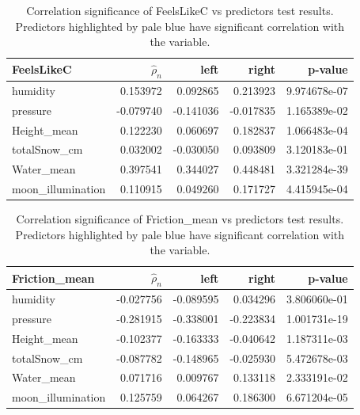 \documentclass[12pt, bachelor, substylefile = algo_title.rtx]{disser}
\theoremstyle{definition}
\begin{document}
\begin{table}[!h]
\centering
\begin{tabular}{|l|r|r|r|r|}
\hline
FeelsLikeC &   $\widehat{\rho}_n$  &      left &     right &        p-value \\
\hline
humidity          & 0.153972 &  0.092865 &  0.213923 &  9.974678e-07 \\
\hline
\cellcolor{blue!25} pressure          & -0.079740 & -0.141036 & -0.017835 &  1.165389e-02 \\
\hline
\cellcolor{blue!25} Height\_mean       & 0.122230 &  0.060697 &  0.182837 &  1.066483e-04 \\
\hline
 totalSnow\_cm      & 0.032002 & -0.030050 &  0.093809 &  3.120183e-01 \\
\hline
\cellcolor{blue!25} Water\_mean        & 0.397541 &  0.344027 &  0.448481 &  3.321284e-39 \\
\hline
\cellcolor{blue!25} moon\_illumination &  0.110915 &  0.049260 &  0.171727 &  4.415945e-04 \\
\hline
\end{tabular}
\caption{Correlation significance of FeelsLikeC vs predictors test results. Predictors highlighted by pale blue have significant correlation with the variable.}
\label{tab: 2}
\end{table}


\begin{table}[!h]
\centering
\begin{tabular}{|l|r|r|r|r|}
\hline
Friction\_mean &   $\widehat{\rho}_n$  &      left &     right &        p-value \\
\hline
humidity          & -0.027756 & -0.089595 &  0.034296 &   3.806060e-01 \\
\hline
\cellcolor{blue!25} pressure          & -0.281915 & -0.338001 & -0.223834 &   1.001731e-19 \\
\hline
\cellcolor{blue!25} Height\_mean       & -0.102377 & -0.163333 & -0.040642 &   1.187311e-03 \\
\hline
\cellcolor{blue!25} totalSnow\_cm      & -0.087782 & -0.148965 & -0.025930 &   5.472678e-03 \\
\hline
\cellcolor{blue!25} Water\_mean        &  0.071716 &  0.009767 &  0.133118 &   2.333191e-02 \\
\hline
\cellcolor{blue!25} moon\_illumination &  0.125759 &  0.064267 &  0.186300 &   6.671204e-05 \\
\hline
\end{tabular}
\caption{Correlation significance of Friction\_mean vs predictors test results. Predictors highlighted by pale blue have significant correlation with the variable.}
\label{tab: 3}
\end{table}
\end{document}
